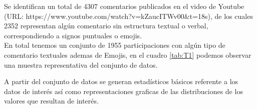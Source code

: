 Se identifican un total de 4307 comentarios publicados en el video de Youtube (URL: https://www.youtube.com/watch?v=kZaucITWv00&t=18s), de los cuales 2352 representan algún comentario sin estructura textual o verbal, correspondiendo a signos puntuales o emojis.\\

En total tenemos un conjunto de 1955 participaciones con algún tipo de comentario textuales ademas de Emojis, en el cuadro \ref{tab:T1} podemos observar una muestra representativa del conjunto de datos. \\

\begin{table}[H]
	\centering
	\caption{}
	\label{tab:T1}
\end{table}

A partir del conjunto de datos se generan estadísticos básicos referente a los datos de interés así como representaciones graficas de las distribuciones de los valores que resultan de interés.\\
 
